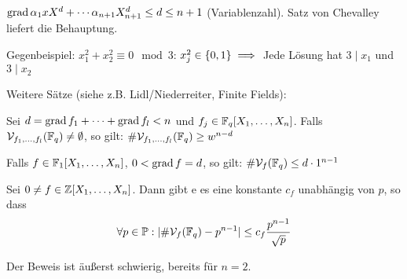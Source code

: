 \documentclass[a4paper,DIV15,BCOR12mm]{article}
\begin{document}
\begin{beweis}
$\mathop{\rm grad}\nolimits \alpha_1xX^d + \cdots \alpha_{n+1}X_{n+1}^d \le d \le n+1$ (Variablenzahl). Satz von Chevalley liefert die Behauptung.
\end{beweis}

Gegenbeispiel: $x_1^2 + x_2^2 \equiv 0 \mod 3$: $x_j^2 \in \{0,1\} \implies$ Jede Lösung hat $3\mid x_1$ und $3\mid x_2$

Weitere Sätze (siehe z.B. Lidl/Niederreiter, Finite Fields):
\begin{satz}[Satz I]
Sei $d = \mathop{\rm grad}\nolimits f_1+ \cdots + \mathop{\rm grad}\nolimits f_l < n$ und $f_j\in\mathbb{F}_q[X_1,\ldots,X_n]$. Falls $\mathcal{V}_{f_1,\ldots,f_l}(\mathbb{F}_q) \ne \emptyset$, so gilt: $\#\mathcal{V}_{f_1,\ldots,f_l}(\mathbb{F}_q) \ge w^{n-d}$
\end{satz}

\begin{satz}[Satz II]
Falls $f\in\mathbb{F}_1[X_1,\ldots,X_n]$, $0< \mathop{\rm grad}\nolimits f=d$, so gilt: $\#\mathcal{V}_{f}(\mathbb{F}_q) \le d\cdot 1^{n-1}$
\end{satz}

\begin{satz}
Sei $0 \ne f\in \mathbb{Z}[X_1,\ldots,X_n]$. Dann gibt e es eine konstante $c_f$ unabhängig von $p$, so dass 
\[ \forall p\in\mathbb{P}: |\#\mathcal{V}_{f}(\mathbb{F}_q) - p^{n-1} | \le c_f \frac{p^{n-1}}{\sqrt p} \]
\end{satz}
Der Beweis ist äußerst schwierig, bereits für $n=2$.

\end{document}
